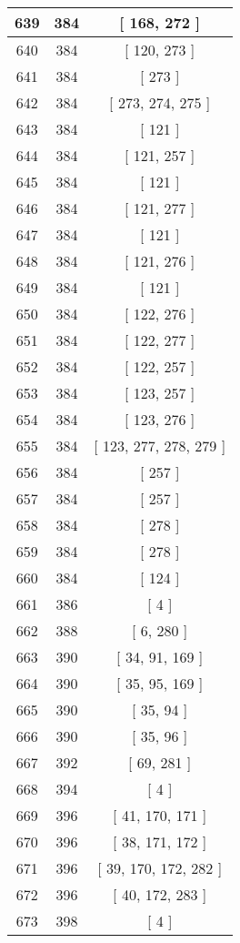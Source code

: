 \begin{center}
\begin{longtable}[H]{|| c c c ||}
\hline
639 & 384 & [ 168, 272 ] \\ 
\hline
640 & 384 & [ 120, 273 ] \\ 
\hline
641 & 384 & [ 273 ] \\ 
\hline
642 & 384 & [ 273, 274, 275 ] \\ 
\hline
643 & 384 & [ 121 ] \\ 
\hline
644 & 384 & [ 121, 257 ] \\ 
\hline
645 & 384 & [ 121 ] \\ 
\hline
646 & 384 & [ 121, 277 ] \\ 
\hline
647 & 384 & [ 121 ] \\ 
\hline
648 & 384 & [ 121, 276 ] \\ 
\hline
649 & 384 & [ 121 ] \\ 
\hline
650 & 384 & [ 122, 276 ] \\ 
\hline
651 & 384 & [ 122, 277 ] \\ 
\hline
652 & 384 & [ 122, 257 ] \\ 
\hline
653 & 384 & [ 123, 257 ] \\ 
\hline
654 & 384 & [ 123, 276 ] \\ 
\hline
655 & 384 & [ 123, 277, 278, 279 ] \\ 
\hline
656 & 384 & [ 257 ] \\ 
\hline
657 & 384 & [ 257 ] \\ 
\hline
658 & 384 & [ 278 ] \\ 
\hline
659 & 384 & [ 278 ] \\ 
\hline
660 & 384 & [ 124 ] \\ 
\hline
661 & 386 & [ 4 ] \\ 
\hline
662 & 388 & [ 6, 280 ] \\ 
\hline
663 & 390 & [ 34, 91, 169 ] \\ 
\hline
664 & 390 & [ 35, 95, 169 ] \\ 
\hline
665 & 390 & [ 35, 94 ] \\ 
\hline
666 & 390 & [ 35, 96 ] \\ 
\hline
667 & 392 & [ 69, 281 ] \\ 
\hline
668 & 394 & [ 4 ] \\ 
\hline
669 & 396 & [ 41, 170, 171 ] \\ 
\hline
670 & 396 & [ 38, 171, 172 ] \\ 
\hline
671 & 396 & [ 39, 170, 172, 282 ] \\ 
\hline
672 & 396 & [ 40, 172, 283 ] \\ 
\hline
673 & 398 & [ 4 ] \\ 

\end{longtable}
\end{center}

